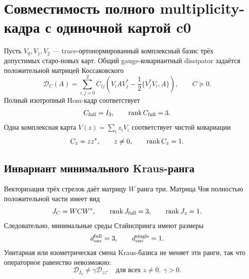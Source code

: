 \chapter{Совместимость полного multiplicity-кадра с одиночной картой c0}
\label{ch:v8-baryon-c0-full-multiplicity-frame-single-map-compatibility-gate}

Пусть $V_0,V_1,V_2$ --- trace-ортонормированный комплексный базис трёх
допустимых старо-новых карт. Общий gauge-ковариантный dissipator задаётся
положительной матрицей Коссаковского
\begin{equation}
 \mathcal D_C(A)=\sum_{i,j=0}^{2}C_{ij}
 \left(V_iAV_j^*-\frac12\{V_j^*V_i,A\}\right),
 \qquad C\succeq0.
 \label{eq:v8-baryon-c0-multiplicity-kossakowski-generator}
\end{equation}
Полный изотропный Hom-кадр соответствует
\begin{equation}
 C_{\rm full}=I_3,
 \qquad \operatorname{rank} C_{\rm full}=3.
 \label{eq:v8-baryon-c0-full-frame-kossakowski-rank}
\end{equation}
Одна комплексная карта $V(z)=\sum_i z_iV_i$ соответствует чистой
ковариации
\begin{equation}
 C_z=zz^*,
 \qquad z\ne0,
 \qquad \operatorname{rank} C_z=1.
 \label{eq:v8-baryon-c0-single-map-kossakowski-rank}
\end{equation}

\section{Инвариант минимального Kraus-ранга}

Векторизация трёх стрелок даёт матрицу $W$ ранга три. Матрица Чоя
полностью положительной части имеет вид
\begin{equation}
 J_C=W C W^*,
 \qquad
 \operatorname{rank} J_{\rm full}=3,
 \qquad
 \operatorname{rank} J_z=1.
 \label{eq:v8-baryon-c0-choi-rank-obstruction}
\end{equation}
Следовательно, минимальные среды Стайнспринга имеют размеры
\begin{equation}
 d_{\rm env}^{\rm full}=3,
 \qquad d_{\rm env}^{\rm single}=1.
 \label{eq:v8-baryon-c0-stinespring-environment-ranks}
\end{equation}
Унитарная или изометрическая смена Kraus-базиса не меняет эти ранги, так
что операторное равенство невозможно:
\begin{equation}
 \mathcal D_{I_3}\ne\gamma\mathcal D_{zz^*}
 \quad\text{для всех }z\ne0,\ \gamma>0.
 \label{eq:v8-baryon-c0-full-frame-not-single-map}
\end{equation}


